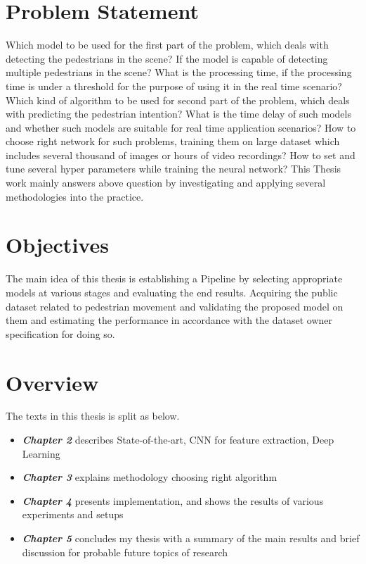 \section{Problem Statement} 
Which model to be used for the first part of the problem, which deals with detecting the pedestrians in the scene? If the model is capable of detecting multiple pedestrians in the scene? What is the processing time, if the processing time is under a threshold for the purpose of using it in the real time scenario?
Which kind of algorithm to be used for second part of the problem, which deals with predicting the pedestrian intention? What is the time delay of such models and whether such models are suitable for real time application scenarios?
How to choose right network for such problems, training them on large dataset which includes several thousand of images or hours of video recordings? How to set and tune several hyper parameters while training the neural network? This Thesis work mainly answers above question by investigating and  applying several methodologies into the practice.

\section{Objectives}
The main idea of this thesis is establishing a Pipeline by selecting appropriate models at various stages and evaluating the end results. Acquiring the public dataset related to pedestrian movement and validating the proposed model on them and estimating the performance in accordance with the dataset owner specification for doing so.

\section{Overview}
The texts in this thesis is split as below.
\begin{itemize}
  \item {\textbf {\textit{Chapter 2}} describes State-of-the-art, CNN for feature extraction, Deep Learning}
  \item {\textbf {\textit{Chapter 3}} explains methodology choosing right algorithm}
	\item {\textbf {\textit{Chapter 4}} presents implementation, and shows the results of various experiments and setups  }
	\item {\textbf {\textit{Chapter 5}} concludes my thesis with a summary of the main results and brief discussion for probable future topics of research}
\end{itemize}